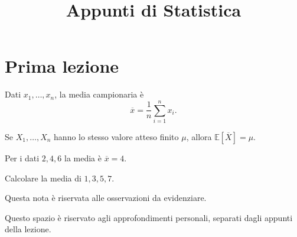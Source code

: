 \documentclass[12pt,a4paper]{article}
\title{Appunti di Statistica}
\author{}
\date{}
\begin{document}
\maketitle
\tableofcontents
\newpage

\section{Prima lezione}

\begin{definizione}
Dati $x_1,\ldots,x_n$, la media campionaria è
\[
\overline{x}=\frac{1}{n}\sum_{i=1}^{n}x_i.
\]
\end{definizione}

\begin{teorema}
Se $X_1,\ldots,X_n$ hanno lo stesso valore atteso finito $\mu$,
allora $\mathbb{E}[\overline{X}]=\mu$.
\end{teorema}

\begin{esempio}
Per i dati $2,4,6$ la media è $\overline{x}=4$.
\end{esempio}

\begin{esercizio}
Calcolare la media di $1,3,5,7$.
\end{esercizio}

\begin{nota}
Questa nota è riservata alle osservazioni da evidenziare.
\end{nota}

\finelezione

\begin{approfondimento}
Questo spazio è riservato agli approfondimenti personali,
separati dagli appunti della lezione.
\end{approfondimento}
\fineapprofondimento
\end{document}
